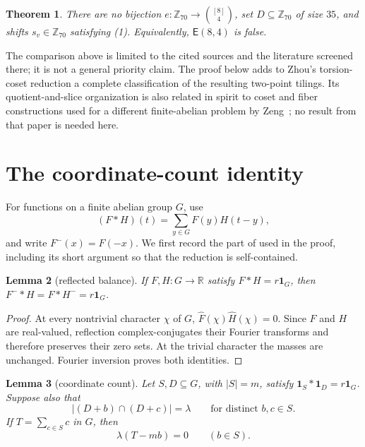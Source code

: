 \documentclass[11pt]{article}
\newtheorem{theorem}{Theorem}
\newtheorem{lemma}[theorem]{Lemma}
\newcommand{\Z}{\mathbb Z}
\newcommand{\ind}{\mathbf 1}
\begin{document}
\begin{theorem}\label{thm:main}
There are no bijection
$e:\Z_{70}\to\binom{[8]}4$, set $D\subseteq\Z_{70}$ of size $35$, and
shifts $s_v\in\Z_{70}$ satisfying \emph{(1)}.  Equivalently,
$\mathsf E(8,4)$ is false.
\end{theorem}

The comparison above is limited to the cited sources and the literature
screened there; it is not a general priority claim.  The proof below adds to
Zhou's torsion-coset reduction a complete classification of the resulting
two-point tilings.  Its quotient-and-slice organization is also related in
spirit to coset and fiber constructions used for a different finite-abelian
problem by Zeng~\cite{zeng2026rainbow}; no result from that paper is needed
here.

\section{The coordinate-count identity}

For functions on a finite abelian group $G$, use
\[
 (F*H)(t)=\sum_{y\in G}F(y)H(t-y),
\]
and write $F^-(x)=F(-x)$.  We first record the part of
\cite[Lemma~2.2]{zhou2026} used in the proof, including its short argument so
that the reduction is self-contained.

\begin{lemma}[reflected balance]\label{lem:reflection}
If $F,H:G\to\mathbb R$ satisfy $F*H=r\ind_G$, then
$F^-*H=F*H^-=r\ind_G$.
\end{lemma}

\begin{proof}
At every nontrivial character $\chi$ of $G$,
$\widehat F(\chi)\widehat H(\chi)=0$.  Since $F$ and $H$ are real-valued,
reflection complex-conjugates their Fourier transforms and therefore
preserves their zero sets.  At the trivial character the masses are
unchanged.  Fourier inversion proves both identities.
\end{proof}

\begin{lemma}[coordinate count]\label{lem:coordinate}
Let $S,D\subseteq G$, with $|S|=m$, satisfy
$\ind_S*\ind_D=r\ind_G$.  Suppose also that
\[
 |(D+b)\cap(D+c)|=\lambda
 \qquad\text{for distinct }b,c\in S.
\]
If $T=\sum_{c\in S}c$ in $G$, then
\[
 \lambda(T-mb)=0\qquad(b\in S).                         \tag{2}
\]
\end{lemma}
\end{document}
